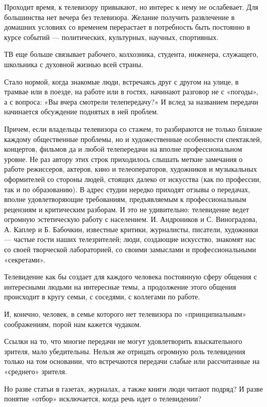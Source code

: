 \documentclass[12pt, a4paper, openany]{book}
\begin{document}
Проходит время, к телевизору привыкают, но интерес к нему не ослабевает. Для большинства нет вечера без телевизора. Желание получить развлечение в домашних условиях со временем перерастает в потребность быть постоянно в курсе событий — политических, культурных, научных, спортивных. 

ТВ еще больше связывает рабочего, колхозника, студента, инженера, служащего, школьника с духовной жизнью всей страны. 

Стало нормой, когда знакомые люди, встречаясь друг с другом на улице, в трамвае или в поезде, на работе или в гостях, начинают разговор не с «погоды», а с вопроса: «Вы вчера смотрели телепередачу?» И вслед за названием передачи начинается обсуждение поднятых в ней проблем. 

Причем, если владельцы телевизора со стажем, то разбираются не только близкие каждому общественные проблемы, но и художественные особенности спектаклей, концертов, фильмов да и любой телепередачи на вполне профессиональном уровне. Не раз автору этих строк приходилось слышать меткие замечания о работе режиссеров, актеров, кино и телеоператоров, художников и музыкальных оформителей со стороны людей, стоящих далеко от искусства (как по профессии, так и по образованию). В адрес студии нередко приходят отзывы о передачах, вполне удовлетворяющие требованиям, предъявляемым к профессиональным рецензиям и критическим разборам. И это не удивительно: телевидение ведет огромную эстетическую работу с населением. И. Андроников и С. Виноградова, А. Каплер и Б. Бабочкин, известные критики, журналисты, писатели, художники — частые гости наших телезрителей; люди, создающие искусство, знакомят нас со своей творческой лабораторией, со своими замыслами и профессиональными «секретами». 

Телевидение как бы создает для каждого человека постоянную сферу общения с интересными людьми на интересные темы, а продолжение этого общения происходит в кругу семьи, с соседями, с коллегами по работе. 

И, конечно, человек, в семье которого нет телевизора по «принципиальным» соображениям, порой нам кажется чудаком.

Ссылки на то, что многие передачи не могут удовлетворить взыскательного зрителя, мало убедительны. Нельзя же отрицать огромную роль телевидения только на том основании, что встречаются передачи слабые или рассчитанные на «среднего» зрителя. 

Но разве статьи в газетах, журналах, а также книги люди читают подряд? И разве понятие «отбор» исключается, когда речь идет о телевидении? 
\end{document}
